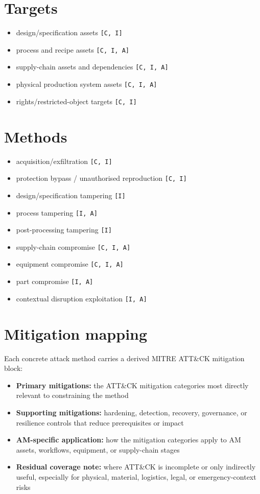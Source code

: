 \documentclass[10pt,a4paper,oneside]{report}
\begin{document}
\section{Targets}


\begin{itemize}
\item design/specification assets \texttt{[C, I]}
\item process and recipe assets \texttt{[C, I, A]}
\item supply-chain assets and dependencies \texttt{[C, I, A]}
\item physical production system assets \texttt{[C, I, A]}
\item rights/restricted-object targets \texttt{[C, I]}
\end{itemize}


\section{Methods}


\begin{itemize}
\item acquisition/exfiltration \texttt{[C, I]}
\item protection bypass / unauthorised reproduction \texttt{[C, I]}
\item design/specification tampering \texttt{[I]}
\item process tampering \texttt{[I, A]}
\item post-processing tampering \texttt{[I]}
\item supply-chain compromise \texttt{[C, I, A]}
\item equipment compromise \texttt{[C, I, A]}
\item part compromise \texttt{[I, A]}
\item contextual disruption exploitation \texttt{[I, A]}
\end{itemize}


\section{Mitigation mapping}


Each concrete attack method carries a derived MITRE ATT\&CK mitigation block:

\begin{itemize}
\item \textbf{Primary mitigations:} the ATT\&CK mitigation categories most directly relevant to constraining the method
\item \textbf{Supporting mitigations:} hardening, detection, recovery, governance, or resilience controls that reduce prerequisites or impact
\item \textbf{AM-specific application:} how the mitigation categories apply to AM assets, workflows, equipment, or supply-chain stages
\item \textbf{Residual coverage note:} where ATT\&CK is incomplete or only indirectly useful, especially for physical, material, logistics, legal, or emergency-context risks
\end{itemize}
\end{document}
